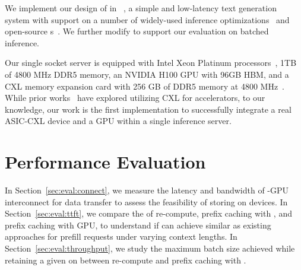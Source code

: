 We implement our design of \tool in \gptfast~\cite{gpt-fast}, a simple and low-latency text generation system with support on a number of widely-used inference optimizations~\cite{leviathan2023fast,narayanan2021efficient,jacob2018quantization} and open-source \llm{}s~\cite{llama2,jiang2023mistral}. 
We further modify \gptfast to support our evaluation on batched inference.

Our single socket server is equipped with Intel Xeon Platinum processors~\cite{intelplatinum}, 1TB of 4800 MHz DDR5 memory, an NVIDIA H100 GPU with 96GB HBM, and a CXL memory expansion card with 256 GB of DDR5 memory at 4800 MHz~\cite{cxl2}. 
While prior works~\cite{cxlgpu1, cxlgpu2, cxlgpu3} have explored utilizing CXL for accelerators, to our knowledge, our work is the first implementation to successfully integrate a real ASIC-CXL device and a GPU within a single inference server.

\section{Performance Evaluation}
\label{sec:eval}

In Section~\ref{sec:eval:connect}, we measure the latency and bandwidth of \cxl-GPU interconnect for data transfer to assess the feasibility of storing \kvcache on \cxl devices.
In Section~\ref{sec:eval:ttft}, we compare the \ttft of \kv re-compute, prefix caching with \cxl, and prefix caching with GPU, to understand if \tool can achieve similar \ttft as existing approaches for prefill requests under varying context lengths.
In Section~\ref{sec:eval:throughput}, we study the maximum batch size achieved while retaining a given \slo on \ttft between \kv re-compute and prefix caching with \cxl.


